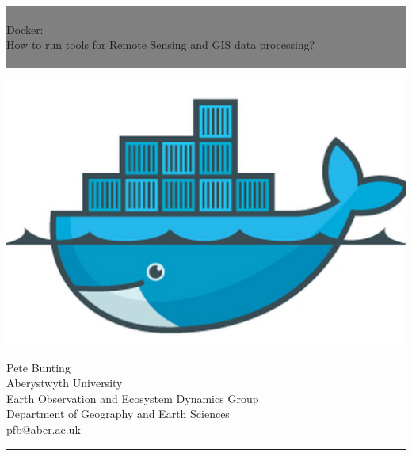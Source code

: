 \documentclass[authoryear, 11pt, oneside]{report}
\newcommand{\HRule}[1]{\hfill \rule{0.2\linewidth}{#1}} %
\begin{document}
\thispagestyle{empty} %


\colorbox{grey}{
	\parbox[t]{1.0\linewidth}{
		\centering \fontsize{150pt}{50pt}\selectfont %
		\vspace*{0.5cm} %
		
		\hfill  \\
		\centering Docker:\\
		\centering How to run tools for Remote Sensing and GIS data processing?\\
		\hfill  \\
		
		\vspace*{0.5cm} %
	}
}

\begin{center}
	\includegraphics[width=0.6\columnwidth]{./figures/docker.jpeg}
\end{center}



\vfill %


{\centering \large 
\hfill Pete Bunting \\
\hfill Aberystwyth University \\
\hfill Earth Observation and Ecosystem Dynamics Group \\
\hfill Department of Geography and Earth Sciences \\
\hfill \url{pfb@aber.ac.uk} \\

\HRule{1pt}} %
\end{document}
